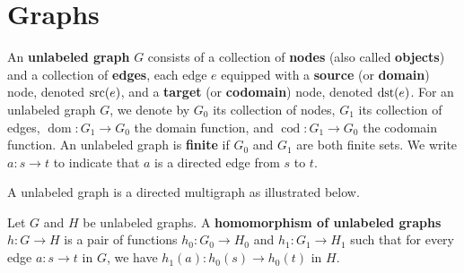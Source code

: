 \documentclass{book}
\begin{document}
 \chapter{Graphs}
    \label{sec:graphs}
    \begin{definition}
        \label{def:graph:unlabeled}
        An \textbf{unlabeled graph} \( G \) consists of a collection of \textbf{nodes} (also called \textbf{objects}) and a collection of \textbf{edges}, each edge $e$ equipped with a \textbf{source} (or \textbf{domain}) node, denoted $\operatorname{src}(e)$, and a \textbf{target} (or \textbf{codomain}) node, denoted $\operatorname{dst}(e)$. 
        For an unlabeled graph \( G \), we denote by \( G_0 \) its collection of nodes, \( G_1 \) its collection of edges, \( \operatorname{dom}:G_1{\to}G_0 \) the domain function, and \( \operatorname{cod}:G_1{\to}G_0 \) the codomain function. An unlabeled graph is \textbf{finite} if \( G_0 \) and \( G_1 \) are both finite sets.
        We write \( a: s \mathop{\to} t \) to indicate that \( a \) is a directed edge from \( s \) to \( t \). 
    \end{definition}   
    \begin{example}
      A unlabeled graph is a directed multigraph as illustrated below.
       
        \begin{center}
      \end{center} 
    \end{example}
    \begin{definition}
        \label{def:unlabeled_graph:homomorphism}
        Let \( G \) and \( H \) be unlabeled graphs. A \textbf{homomorphism of unlabeled graphs} $h: G \mathop{\to} H$ is a pair of functions $h_0: G_0 \mathop{\to} H_0 $ and $h_1: G_1 \mathop{\to} H_1$ such that for every edge \( a: s \mathop{\to} t \) in \( G \), we have \( h_1(a) : h_0(s) \mathop{\to} h_0(t) \) in \( H \).
    \end{definition}
\end{document}
